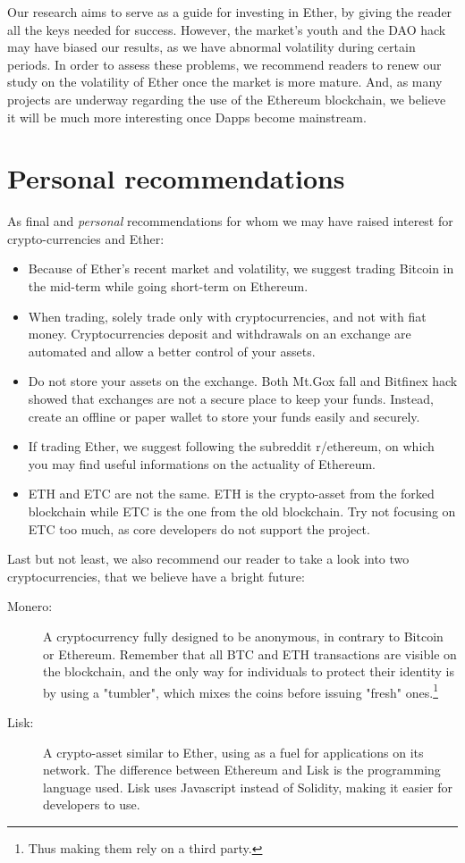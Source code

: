\documentclass[11pt]{report}
\begin{document}
Our research aims to serve as a guide for investing in Ether, by giving the reader all the keys needed for success. However, the market's youth and the DAO hack may have biased our results, as we have abnormal volatility during certain periods. In order to assess these problems, we recommend readers to renew  our study on the volatility of Ether once the market is more mature. And, as many projects are underway regarding the use of the Ethereum blockchain, we believe it will be much more interesting once Dapps become mainstream. 
\clearpage
\section*{Personal recommendations}
As final and \textit{personal} recommendations for whom we may have raised interest for crypto-currencies and Ether: 
\begin{itemize}
\item Because of Ether's recent market and volatility, we suggest trading Bitcoin in the mid-term while going short-term on Ethereum.
\item When trading, solely trade only with cryptocurrencies, and not with fiat money. Cryptocurrencies deposit and withdrawals on an exchange are automated and allow a better control of your assets.
\item Do not store your assets on the exchange. Both Mt.Gox fall and Bitfinex hack showed that exchanges are not a secure place to keep your funds. Instead, create an offline or paper wallet to store your funds easily and securely.
\item If trading Ether, we suggest following the subreddit r/ethereum, on which you may find useful informations on the actuality of Ethereum.
\item ETH and ETC are not the same. ETH is the crypto-asset from the forked blockchain while ETC is the one from the old blockchain. Try not focusing on ETC too much, as core developers do not support the project.
\end{itemize}
\smallbreak

Last but not least, we also recommend our reader to take a look into two cryptocurrencies, that we believe have a bright future: \begin{description}
\item[Monero:] A cryptocurrency fully designed to be anonymous, in contrary to Bitcoin or Ethereum. Remember that all BTC and ETH transactions are visible on the blockchain, and the only way for individuals to protect their identity is by using a "tumbler", which mixes the coins before issuing "fresh" ones.\footnote{Thus making them rely on a third party.}
\item[Lisk:] A crypto-asset similar to Ether, using as a fuel for applications on its network. 
The difference between Ethereum and Lisk is the programming language used. Lisk uses Javascript instead of Solidity, making it easier for developers to use. 
\end{description}
\end{document}
